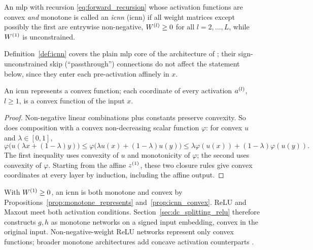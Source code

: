 \begin{definition}\label{def:icnn}
An \ac{mlp} with recursion \eqref{eq:forward_recursion} whose activation functions are convex \emph{and} monotone is called an \emph{\acl{icnn}} (\acs{icnn}) if all weight matrices except possibly the first are entrywise non-negative, $W^{(l)} \ge 0$ for all $l = 2, \ldots, L$, while $W^{(1)}$ is unconstrained.
\end{definition}

Definition~\ref{def:icnn} covers the plain \ac{mlp} core of the architecture of \textcite{Amos2017}; their sign-unconstrained skip (``passthrough'') connections do not affect the statement below, since they enter each pre-activation affinely in $x$.

\begin{proposition}\label{prop:icnn_convex}
An \ac{icnn} represents a convex function; each coordinate of every activation $a^{(l)}$, $l \ge 1$, is a convex function of the input $x$.\end{proposition}

\begin{proof}
Non-negative linear combinations plus constants preserve convexity. So does composition with a convex non-decreasing scalar function $\varphi$: for convex $u$ and $\lambda\in[0,1]$,
\[
\varphi\bigl(u(\lambda x+(1-\lambda)y)\bigr)
\le\varphi\bigl(\lambda u(x)+(1-\lambda)u(y)\bigr)
\le\lambda\varphi(u(x))+(1-\lambda)\varphi(u(y)).
\]
The first inequality uses convexity of $u$ and monotonicity of $\varphi$; the second uses convexity of $\varphi$. Starting from the affine $z^{(1)}$, these two closure rules give convex coordinates at every layer by induction, including the affine output.
\end{proof}

\begin{remark}\label{rem:monotone_convex_combined}
With $W^{(1)}\ge0$, an \ac{icnn} is both monotone and convex by Propositions~\ref{prop:monotone_represents} and~\ref{prop:icnn_convex}. ReLU and Maxout meet both activation conditions. Section~\ref{sec:dc_splitting_relu} therefore constructs $g,h$ as monotone networks on a signed input embedding, convex in the original input. Non-negative-weight ReLU networks represent only convex functions; broader monotone architectures add concave activation counterparts \parencite{Runje_2023}.
\end{remark}

